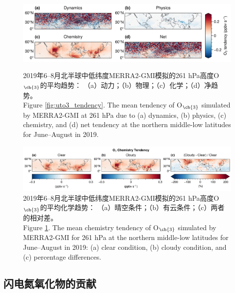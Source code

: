 \begin{landscape}
\clearpage\vspace*{\fill}
\begin{figure}[H]
    \centering
    \includegraphics[width=0.7\columnwidth]{./figures/uto3_tendency.png}
    \caption{
    2019年6--8月北半球中低纬度MERRA2-GMI模拟的261 hPa高度O$_{\ch{3}}$的平均趋势：
    （a）动力；（b）物理；（c）化学；（d）净趋势。\\
    Figure \ref{fig:uto3_tendency}. The mean tendency of O$_{\ch{3}}$ simulated by MERRA2-GMI at 261 hPa due to (a) dynamics, (b) physics, (c) chemistry, and (d) net tendency at the northern middle-low latitudes for June--August in 2019.
    }
    \label{fig:uto3_tendency}


    \centering
    \includegraphics[width=0.85\columnwidth]{./figures/uto3_chem_tendency.png}
    \caption{
    2019年6--8月北半球中低纬度MERRA2-GMI模拟的261 hPa高度O$_{\ch{3}}$的平均化学趋势：
    （a）晴空条件；（b）有云条件；（c）两者的相对差。\\
    Figure \ref{fig:uto3_chem_tendency}. The mean chemistry tendency of O$_{\ch{3}}$ simulated by MERRA2-GMI for 261 hPa at the northern middle-low latitudes for June--August in 2019:
    (a) clear condition, (b) cloudy condition, and (c) percentage differences.
    }
    \label{fig:uto3_chem_tendency}
\end{figure}
\vspace*{\fill}\clearpage
\end{landscape}

\subsection{闪电氮氧化物的贡献}

